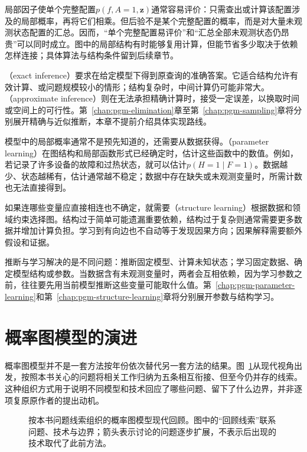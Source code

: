 局部因子使单个完整配置$p(f,A=1,\bm{z})$通常容易评价：只需查出或计算该配置涉及的局部概率，再将它们相乘。但后验不是某个完整配置的概率，而是对大量未观测状态配置的汇总。因而，“单个完整配置易评价”和“汇总全部未观测状态仍昂贵”可以同时成立。图中的局部结构有时能够复用计算，但能节省多少取决于依赖怎样连接；具体算法与结构条件留到后续章节。

（exact inference）要求在给定模型下得到原查询的准确答案。它适合结构允许有效计算、或问题规模较小的情形；结构复杂时，中间计算仍可能非常大。（approximate inference）则在无法承担精确计算时，接受一定误差，以换取时间或空间上的可行性。第~\ref{chap:pgm-elimination}章至第~\ref{chap:pgm-sampling}章将分别展开精确与近似推断，本章不提前介绍具体实现路线。

模型中的局部概率通常不是预先知道的，还需要从数据获得。（parameter learning）在图结构和局部函数形式已经确定时，估计这些函数中的数值。例如，若记录了许多设备的故障和过热状态，就可以估计$p(H=1\mid F=1)$。数据越少、状态越稀有，估计通常越不稳定；数据中存在缺失或未观测变量时，所需计数也无法直接得到。

如果连哪些变量应直接相连也不确定，就需要（structure learning）根据数据和领域约束选择图。结构过于简单可能遗漏重要依赖，结构过于复杂则通常需要更多数据并增加计算负担。学习到有向边也不自动等于发现因果方向；因果解释需要额外假设和证据。

推断与学习解决的是不同问题：推断固定模型、计算未知状态；学习固定数据、确定模型结构或参数。当数据含有未观测变量时，两者会互相依赖，因为学习参数之前，往往要先用当前模型推断这些变量可能取什么值。第~\ref{chap:pgm-parameter-learning}和第~\ref{chap:pgm-structure-learning}章将分别展开参数与结构学习。

\section{概率图模型的演进}
\label{sec:pgm-overview-history}

概率图模型并不是一套方法按年份依次替代另一套方法的结果。图~\ref{fig:pgm-overview-history}从现代视角出发，按照本书关心的问题将相关工作归纳为五条相互衔接、但至今仍并存的线索。这种组织方式用于说明不同模型和技术回应了哪些问题、留下了什么边界，并非逐项复原原作者的提出动机。

\begin{figure}[htbp]
  \centering
  
  \caption{按本书问题线索组织的概率图模型现代回顾。图中的“回顾线索”联系问题、技术与边界；箭头表示讨论的问题逐步扩展，不表示后出现的技术取代了此前方法。}
  \label{fig:pgm-overview-history}
\end{figure}

